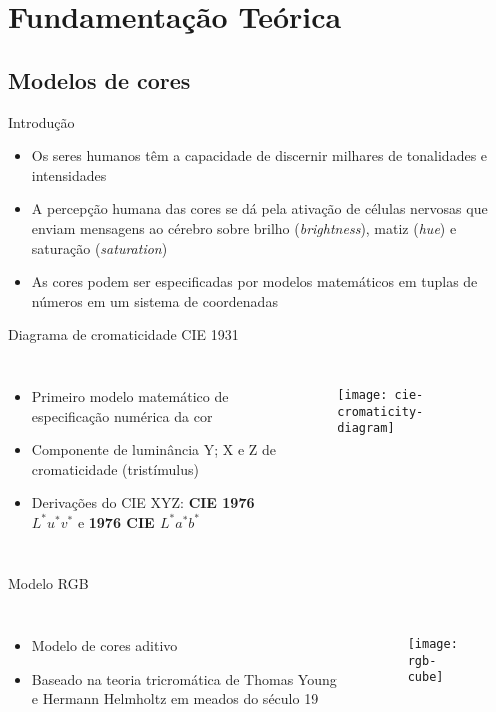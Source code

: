 \section{Fundamentação Teórica}
\subsection{Modelos de cores}

\begin{frame}{Introdução}
\begin{itemize}
    \item Os seres humanos têm a capacidade de discernir milhares de tonalidades e intensidades
    \item A percepção humana das cores se dá pela ativação de células nervosas que enviam mensagens ao cérebro sobre brilho (\textit{brightness}), matiz (\textit{hue}) e saturação (\textit{saturation})
    \item As cores podem ser especificadas por modelos matemáticos em tuplas de números em um sistema de coordenadas
\end{itemize}
\end{frame}

\begin{frame}{Diagrama de cromaticidade CIE 1931}
\begin{columns}
\begin{itemize}
    \item Primeiro modelo matemático de especificação numérica da cor
    \item Componente de luminância Y; X e Z de cromaticidade (tristímulus)
    \item Derivações do CIE XYZ: \textbf{CIE 1976 $L^*u^*v^*$} e \textbf{1976 CIE $L^*a^*b^*$}
\end{itemize}
\begin{figure}[!h]
  \centering
  \texttt{[image: cie-cromaticity-diagram]}
\end{figure}
\end{columns}
\end{frame}

\begin{frame}{Modelo RGB}
\begin{columns}
\begin{itemize}
    \item Modelo de cores aditivo
    \item Baseado na teoria tricromática de Thomas Young e Hermann Helmholtz em meados do século 19
\end{itemize}
\begin{figure}[!h]
  \centering
  \texttt{[image: rgb-cube]}
\end{figure}
\end{columns}
\end{frame}

